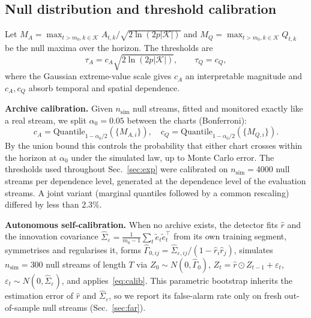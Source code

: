 \documentclass[conference]{IEEEtran}
\begin{document}
\subsection{Null distribution and threshold calibration}\label{sec:calib}
Let $M_A=\max_{t>m_0,k\in\mathcal{K}}A_{t,k}/\sqrt{2\ln(2p|\mathcal{K}|)}$ and $M_Q=\max_{t>m_0,k\in\mathcal{K}}Q_{t,k}$ be the null maxima over the horizon. The thresholds are
\begin{equation}
\tau_A=c_A\sqrt{2\ln(2p|\mathcal{K}|)},\qquad \tau_Q=c_Q, \label{eq:tau}
\end{equation}
where the Gaussian extreme-value scale gives $c_A$ an interpretable magnitude and $c_A,c_Q$ absorb temporal and spatial dependence.

\textbf{Archive calibration.} Given $n_{\mathrm{sim}}$ null streams, fitted and monitored exactly like a real stream, we split $\alpha_0=0.05$ between the charts (Bonferroni):
\begin{equation}
c_A=\mathrm{Quantile}_{1-\alpha_0/2}(\{M_{A,i}\}),\quad c_Q=\mathrm{Quantile}_{1-\alpha_0/2}(\{M_{Q,i}\}). \label{eq:calib}
\end{equation}
By the union bound this controls the probability that either chart crosses within the horizon at $\alpha_0$ under the simulated law, up to Monte Carlo error. The thresholds used throughout Sec.~\ref{sec:exp} were calibrated on $n_{\mathrm{sim}}=4000$ null streams per dependence level, generated at the dependence level of the evaluation streams. A joint variant (marginal quantiles followed by a common rescaling) differed by less than 2.3\%.

\textbf{Autonomous self-calibration.} When no archive exists, the detector fits $\hat r$ and the innovation covariance $\hat\Sigma_\varepsilon=\frac{1}{m_0-1}\sum_t\tilde e_t\tilde e_t^\top$ from its own training segment, symmetrises and regularises it, forms $\hat\Gamma_{0,ij}=\hat\Sigma_{\varepsilon,ij}/(1-\hat r_i\hat r_j)$, simulates $n_{\mathrm{sim}}=300$ null streams of length $T$ via $Z_0\sim N(0,\hat\Gamma_0)$, $Z_t=\hat r\odot Z_{t-1}+\varepsilon_t$, $\varepsilon_t\sim N(0,\hat\Sigma_\varepsilon)$, and applies~\eqref{eq:calib}. This parametric bootstrap inherits the estimation error of $\hat r$ and $\hat\Sigma_\varepsilon$, so we report its false-alarm rate only on fresh out-of-sample null streams (Sec.~\ref{sec:far}).
\end{document}
